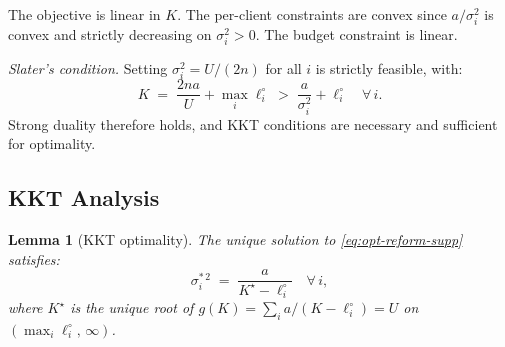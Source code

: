 \documentclass[letterpaper,journal]{IEEEtran}
\newtheorem{lemma}{Lemma}[section]
\begin{document}
\noindent The objective is linear in $K$. The per-client constraints are
convex since $a/\sigma_i^2$ is convex and strictly decreasing
on $\sigma_i^2 > 0$. The budget constraint is linear.

\medskip
\noindent\textit{Slater's condition.} Setting $\sigma_i^2 =
U/(2n)$ for all $i$ is strictly feasible, with:
\[
K \;=\; \frac{2na}{U} + \max_i \ell_i^\circ
\;>\; \frac{a}{\sigma_i^2} + \ell_i^\circ
\quad \forall\, i.
\]
Strong duality therefore holds, and KKT conditions are
necessary and sufficient for optimality.

\subsection{KKT Analysis}

\begin{lemma}[KKT optimality]
\label{lem:kkt}
The unique solution to \eqref{eq:opt-reform-supp} satisfies:
\[
\sigma_i^{*\,2} \;=\; \frac{a}{K^\star - \ell_i^\circ}
\quad \forall\, i,
\]
where $K^\star$ is the unique root of
$g(K) = \sum_i a/(K - \ell_i^\circ) = U$ on
$({\max_i \ell_i^\circ},\, \infty)$.
\end{lemma}
\end{document}
